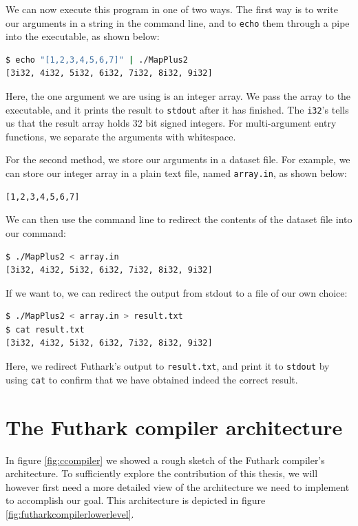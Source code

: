 We can now execute this program in one of two ways.
The first way is to write our arguments in a string in the command line, and
to \texttt{echo} them through a pipe into the executable, as shown below:
  \begin{lstlisting}[language=sh]
$ echo "[1,2,3,4,5,6,7]" | ./MapPlus2
[3i32, 4i32, 5i32, 6i32, 7i32, 8i32, 9i32]
  \end{lstlisting}
Here, the one argument we are using is 
an integer array. We pass the array to the executable, and it prints the result
to \texttt{stdout} after it has finished. The \texttt{i32}'s tells us that the
result array holds 32 bit signed integers.
For multi-argument entry functions, we separate the arguments with whitespace.

For the second method, we store our arguments in a dataset file. For example, we
can store our integer array in a plain text file, named {\tt array.in}, 
as shown below: %
  \begin{lstlisting}
[1,2,3,4,5,6,7]
  \end{lstlisting}
We can then use the command line to redirect the contents of the dataset file
into our command:
  \begin{lstlisting}[language=sh]
$ ./MapPlus2 < array.in
[3i32, 4i32, 5i32, 6i32, 7i32, 8i32, 9i32]
  \end{lstlisting}
If we want to, we can redirect the output from stdout to a file of our own
choice: %
  \begin{lstlisting}[language=sh]
$ ./MapPlus2 < array.in > result.txt
$ cat result.txt
[3i32, 4i32, 5i32, 6i32, 7i32, 8i32, 9i32]
  \end{lstlisting}
Here, we redirect Futhark's output to \texttt{result.txt}, and print it to 
\texttt{stdout} by using \texttt{cat} to confirm that we have obtained indeed 
the correct result.

\clearpage

\section{The Futhark \csharp{} compiler architecture}
In figure \ref{fig:ccompiler} we showed a rough sketch of the
Futhark compiler's architecture. To sufficiently explore the contribution of
this thesis, we will however first need a more detailed view of the architecture
we need to implement to accomplish our goal.
This architecture is depicted in figure \ref{fig:futharkcompilerlowerlevel}.

